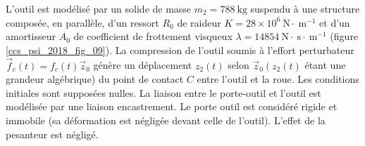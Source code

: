 L'outil est modélisé par un solide de masse $m_{2}=788 \mathrm{~kg}$ suspendu à une structure composée, en parallèle, d'un ressort $R_{0}$ de raideur $K=28 \times 10^{6} \mathrm{~N} \cdot \mathrm{~m}^{-1}$ et d'un amortisseur $A_{0}$ de coefficient de frottement visqueux $\lambda=14854 \mathrm{~N} \cdot \mathrm{~s} \cdot \mathrm{~m}^{-1}$ (figure \ref{ccs_psi_2018_fig_09}). La compression de l'outil soumis à l'effort perturbateur $\vec{f}_{c}(t)=f_{c}(t) \vec{z}_{0}$ génère un déplacement $z_{2}(t)$ selon $\vec{z}_{0}\left(z_{2}(t)\right.$ étant une grandeur algébrique) du point de contact $C$ entre l'outil et la roue. Les conditions initiales sont supposées nulles. La liaison entre le porte-outil et l'outil est modélisée par une liaison encastrement. Le porte outil est considéré rigide et immobile (sa déformation est négligée devant celle de l'outil). L'effet de la pesanteur est négligé.\\

